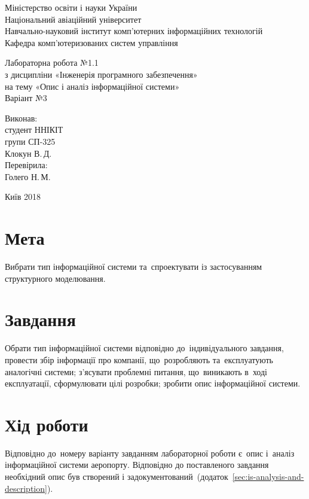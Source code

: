 \documentclass[
	a4paper,
	oneside,
	DIV = 12,
	12pt,
	headings = normal,
]{scrartcl}
\begin{document}
	\begin{titlepage}
		\begin{center}
			Міністерство освіти і науки України\\
			Національний авіаційний університет\\
			Навчально-науковий інститут комп'ютерних інформаційних технологій\\
			Кафедра комп'ютеризованих систем управління

			\vspace{\fill}
				Лабораторна робота №1.1\\
				з дисципліни «Інженерія програмного забезпечення»\\
				на тему «Опис і аналіз інформаційної системи»\\
				Варіант №3

			\vspace{\fill}

			\begin{flushright}
				Виконав:\\
				студент ННІКІТ\\
				групи СП-325\\
				Клокун В.\,Д.\\
				Перевірила:\\
				Голего Н.\,М.
			\end{flushright}

			Київ 2018
		\end{center}
	\end{titlepage}

	\section{Мета}
		Вибрати тип інформаційної системи та~спроектувати із застосуванням структурного моделювання.

	\section{Завдання}
		Обрати тип інформаційної системи відповідно до~індивідуального завдання, провести збір інформації про компанії, що~розробляють та~експлуатують аналогічні системи; з'ясувати проблемні питання, що~виникають в~ході експлуатації, сформулювати цілі розробки; зробити опис інформаційної системи.
		
	\section{Хід роботи}
		Відповідно до~номеру варіанту завданням лабораторної роботи є~опис і~аналіз інформаційної системи аеропорту. Відповідно до поставленого завдання необхідний опис був створений і задокументований~(додаток~\ref{sec:is-analysis-and-description}).
\end{document}
